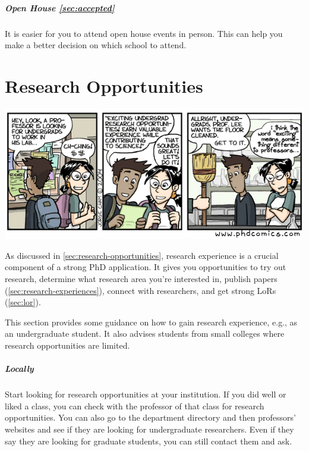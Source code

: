\documentclass[oneside,11pt,dvipsnames]{book}
\newenvironment{domesticbox}[1][]{
  \small
  \begin{mydomesticbox}
    {\small \textbf{#1}}
  }{
  \end{mydomesticbox}
}
\begin{document}
\paragraph{Open House \autoref{sec:accepted}} It is easier for you to attend open house events in person.  This can help you make a better decision on which school to attend.


\chapter{Research Opportunities}\label{sec:research-opportunities}
\begin{center}
    \includegraphics[scale=0.5]{files/phd100404s.png}
  \end{center}

As discussed in \autoref{sec:research-opportunities}, research experience is a crucial component of a strong PhD application. It gives you opportunities to try out research, determine what research area you're interested in, publish papers (\autoref{sec:research-experiences}), connect with researchers, and get strong LoRs (\autoref{sec:lor}).

 This section provides some guidance on how to gain research experience, e.g., as an undergraduate student.  It also advises students from small colleges where research opportunities are limited.

\paragraph{Locally} Start looking for research opportunities at your institution.
If you did well or liked a class, you can check with the professor of that class for research opportunities.
You can also go to the department directory and then professors' websites and see if they are looking for undergraduate researchers.
Even if they say they are looking for graduate students, you can still contact them and ask.
\end{document}
